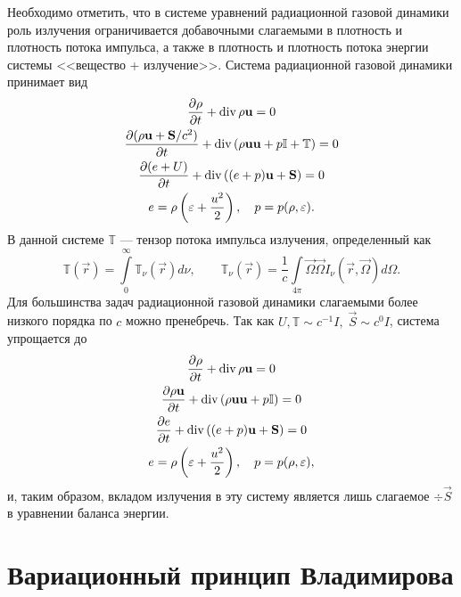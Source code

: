 Необходимо отметить, что в системе уравнений радиационной газовой динамики роль излучения ограничивается добавочными слагаемыми в плотность и плотность потока импульса, а также в плотность и плотность потока энергии системы <<вещество + излучение>>. Система радиационной газовой динамики принимает вид \cite{chetverushkin1985}
\[
\begin{gathered}
\frac{\partial \rho}{\partial t} + \operatorname{div} \rho \boldsymbol{\mathbf{u}} = 0\\
\frac{\partial (\rho \boldsymbol{\mathbf{u}} + \boldsymbol{\mathbf{S}} / c^2)}{\partial t} + \operatorname{div} \left(\rho \boldsymbol{\mathbf{u}} \boldsymbol{\mathbf{u}} + p \mathbb I + \mathbb T \right) = 0\\
\frac{\partial (e + U)}{\partial t} + \operatorname{div} \left((e + p)\boldsymbol{\mathbf{u}} + \boldsymbol{\mathbf{S}} \right) = 0\\
e = \rho \left(\varepsilon + \frac{u^2}{2}\right),\quad  p = p(\rho, \varepsilon).
\end{gathered}
\]
В данной системе $\mathbb T$ --- тензор потока импульса излучения, определенный как
\[
\mathbb T(\vec r) = \int\limits_0^\infty \mathbb T_\nu(\vec r) d\nu, \qquad
\mathbb T_\nu(\vec r) = \frac{1}{c}\int\limits_{4\pi} \vec \Omega \vec \Omega I_\nu(\vec r, \vec \Omega) d\Omega.
\]
Для большинства задач радиационной газовой динамики слагаемыми более низкого порядка по $c$ можно пренебречь. Так как $U,\mathbb T \sim c^{-1} I,\; \vec S \sim c^0 I$, система упрощается до
\[
\begin{gathered}
\frac{\partial \rho}{\partial t} + \operatorname{div} \rho \boldsymbol{\mathbf{u}} = 0\\
\frac{\partial \rho \boldsymbol{\mathbf{u}}}{\partial t} + \operatorname{div} \left(\rho \boldsymbol{\mathbf{u}} \boldsymbol{\mathbf{u}} + p \mathbb I\right) = 0\\
\frac{\partial e}{\partial t} + \operatorname{div} \left((e + p)\boldsymbol{\mathbf{u}} + \boldsymbol{\mathbf{S}} \right) = 0\\
e = \rho \left(\varepsilon + \frac{u^2}{2}\right),\quad  p = p(\rho, \varepsilon),
\end{gathered}
\]
и, таким образом, вкладом излучения в эту систему является лишь слагаемое $\div \vec S$ в уравнении баланса энергии.

\section{Вариационный принцип Владимирова}

